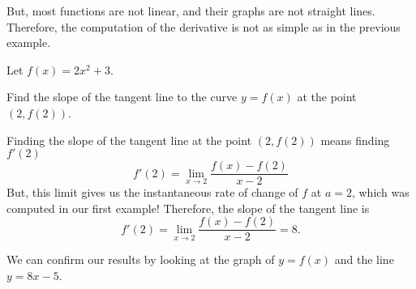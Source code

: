 \documentclass{ximera}
\begin{document}
But, most functions are not linear, and  their graphs are not  straight lines.  Therefore, the computation of the derivative is not as simple as in the previous example.

\begin{example}
	Let $f(x) = 2x^2+3$.
	
	 Find the slope of the tangent line to the curve $y=f(x)$ at the point $(2,f(2))$.
			\begin{explanation}
			  Finding the slope of the tangent line at the point $(2,f(2))$ means finding $f'(2)$
		\[
 f'(2) = \lim_{x\to 2} \frac{f(x) - f(2)}{x-2}
  \]
But, this limit gives us the instantaneous rate of change of $f$ at $a=2$, which was computed in our first example!
Therefore,	
the slope of the tangent line is 
\[
 f'(2) = \lim_{x\to 2} \frac{f(x) - f(2)}{x-2}=8.
  \]
		 	\end{explanation}
			  \begin{onlineOnly}
  We can confirm our results by looking at the graph of $y=f(x)$ and the line $y=8x-5$. 
  \begin{image}
\end{image}
  \end{onlineOnly}
			
	\end{example}
\end{document}

